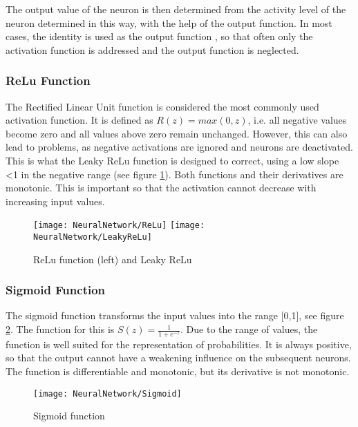 The output value of the neuron is then determined from the activity level of the neuron determined in this way, with the help of the output function. In most cases, the identity is used as the output function \cite{Beck.2018}, so that often only the activation function is addressed and the output function is neglected.

\subsubsection{ReLu Function}

The Rectified Linear Unit function is considered the most commonly used activation function. It is defined as $R(z)=max(0,z)$, i.e. all negative values become zero and all values above zero remain unchanged. However, this can also lead to problems, as negative activations are ignored and neurons are deactivated. This is what the Leaky ReLu function is designed to correct, using a low slope <1 in the negative range (see figure \ref{ReLu}). Both functions and their derivatives are monotonic. This is important so that the activation cannot decrease with increasing input values. \cite{Gupta:2020b}\cite{AIUnitedRedaktion.20.12.2018}

\begin{figure}[H]
	\begin{center}
		\texttt{[image: NeuralNetwork/ReLu]}
		\texttt{[image: NeuralNetwork/LeakyReLu]}
		\caption{ReLu function (left) and Leaky ReLu} 
		\label{ReLu}
	\end{center}
\end{figure}

\subsubsection{Sigmoid Function} 

The sigmoid function transforms the input values into the range [0,1], see figure \ref{Sigmoid}. The function for this is $S(z)=\frac{1}{1+e^{-z}}$. Due to the range of values, the function is well suited for the representation of probabilities. It is always positive, so that the output cannot have a weakening influence on the subsequent neurons. The function is differentiable and monotonic, but its derivative is not monotonic. \cite{Gupta:2020b}\cite{AIUnitedRedaktion.20.12.2018}

\begin{figure}[H]
	\begin{center}
		\texttt{[image: NeuralNetwork/Sigmoid]}
		\caption{Sigmoid function} 
		\label{Sigmoid}
	\end{center}
\end{figure}

